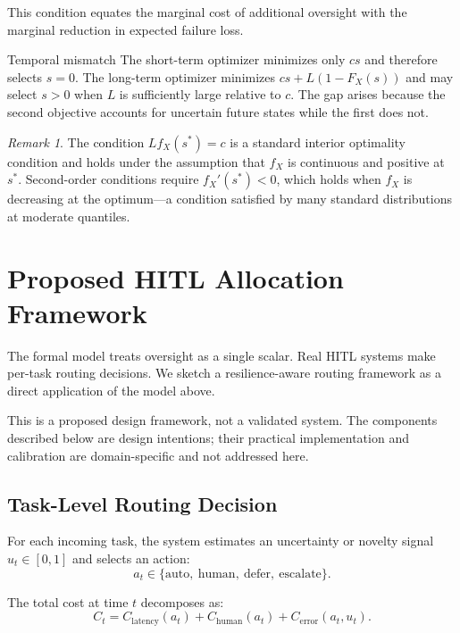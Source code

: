 \documentclass[11pt,a4paper]{article}
\theoremstyle{definition}
\theoremstyle{plain}
\theoremstyle{remark}
\newtheorem{remark}{Remark}
\begin{document}
This condition equates the marginal cost of additional oversight with the marginal reduction in expected failure loss.

\begin{definitionbox}{Temporal mismatch}
The short-term optimizer minimizes only $cs$ and therefore selects $s = 0$. The long-term optimizer minimizes $cs + L(1 - F_X(s))$ and may select $s > 0$ when $L$ is sufficiently large relative to $c$. The gap arises because the second objective accounts for uncertain future states while the first does not.
\end{definitionbox}

\begin{remark}
The condition $L f_X(s^*) = c$ is a standard interior optimality condition and holds under the assumption that $f_X$ is continuous and positive at $s^*$. Second-order conditions require $f_X'(s^*) < 0$, which holds when $f_X$ is decreasing at the optimum---a condition satisfied by many standard distributions at moderate quantiles.
\end{remark}

\section{Proposed HITL Allocation Framework}

The formal model treats oversight as a single scalar. Real HITL systems make per-task routing decisions. We sketch a resilience-aware routing framework as a direct application of the model above.

\begin{cautionbox}
This is a proposed design framework, not a validated system. The components described below are design intentions; their practical implementation and calibration are domain-specific and not addressed here.
\end{cautionbox}

\subsection{Task-Level Routing Decision}

For each incoming task, the system estimates an uncertainty or novelty signal $u_t \in [0, 1]$ and selects an action:
\[
a_t \in \{\text{auto},\ \text{human},\ \text{defer},\ \text{escalate}\}.
\]

The total cost at time $t$ decomposes as:
\[
C_t = C_{\text{latency}}(a_t) + C_{\text{human}}(a_t) + C_{\text{error}}(a_t, u_t).
\]
\end{document}
